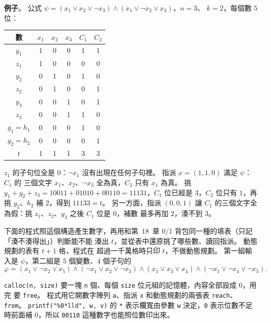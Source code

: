 \textbf{例子}。 公式 $\psi = (x_1 \vee x_2 \vee \neg x_3) \wedge (x_1 \vee \neg x_2 \vee x_3)$，$n = 3$、
$k = 2$，每個數 $5$ 位：

\begin{center}
\begin{tabular}{c|ccc|cc}
\toprule
數 & $x_1$ & $x_2$ & $x_3$ & $C_1$ & $C_2$ \\
\midrule
$y_1$ & 1 & 0 & 0 & 1 & 1 \\
$z_1$ & 1 & 0 & 0 & 0 & 0 \\
$y_2$ & 0 & 1 & 0 & 1 & 0 \\
$z_2$ & 0 & 1 & 0 & 0 & 1 \\
$y_3$ & 0 & 0 & 1 & 0 & 1 \\
$z_3$ & 0 & 0 & 1 & 1 & 0 \\
$g_1 = h_1$ & 0 & 0 & 0 & 1 & 0 \\
$g_2 = h_2$ & 0 & 0 & 0 & 0 & 1 \\
\midrule
$t$ & 1 & 1 & 1 & 3 & 3 \\
\bottomrule
\end{tabular}
\end{center}

$z_1$ 的子句位全是 $0$：$\neg x_1$ 沒有出現在任何子句裡。 指派 $x = (1, 1, 0)$ 滿足 $\psi$：$C_1$ 的
三個文字 $x_1$、$x_2$、$\neg x_3$ 全為真，$C_2$ 只有 $x_1$ 為真。 挑 $y_1 + y_2 + z_3 = 10011 + 01010
+ 00110 = 11131$，$C_1$ 位已經是 $3$，$C_2$ 位只有 $1$，再挑 $g_2$、$h_2$ 補 $2$，得到 $11133 = t$。
另一方面，指派 $(0, 0, 1)$ 讓 $C_1$ 的三個文字全為假：挑 $z_1$、$z_2$、$y_3$ 之後 $C_1$ 位是 $0$，補數
最多再加 $2$，湊不到 $3$。

下面的程式照這個構造產生數字，再用和第~18~章 0/1 背包同一種的填表（只記「湊不湊得出」）判斷能不能
湊出 $t$，並從表中還原挑了哪些數、讀回指派。 動態規劃的表有 $t + 1$ 格，程式在
超過一千萬格時只印 $t$，不做動態規劃。 第一組輸入是 $\psi$，第二組是 $5$ 個變數、$4$ 個子句的
\[
\varphi = (x_1 \vee \neg x_2 \vee x_5) \wedge (\neg x_1 \vee x_2 \vee \neg x_3) \wedge (x_1 \vee x_3 \vee
x_4) \wedge (\neg x_1 \vee \neg x_4 \vee \neg x_5).
\]

\begin{cbookrecap}
\texttt{calloc(n, size)} 要一塊 \texttt{n} 個、每個 \texttt{size} 位元組的記憶體，內容全部設成 $0$，用完
要 \texttt{free}。 程式用它開數字陣列 \texttt{a}、指派 \texttt{x} 和動態規劃的兩張表 \texttt{reach}、
\texttt{from}。 \texttt{printf("\%0*lld", w, v)} 的 \texttt{*} 表示欄寬由參數 \texttt{w} 決定，\texttt{0}
表示位數不足時前面補 $0$，所以 \texttt{00110} 這種數字也能照位數印出來。
\end{cbookrecap}

